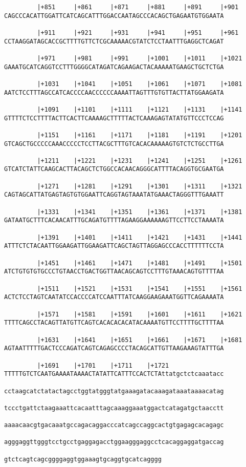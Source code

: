 \documentclass{article}
\begin{document}
\begin{Verbatim}
         |+851     |+861     |+871     |+881     |+891     |+901
CAGCCCACATTGGATTCATCAGCATTTGGACCAATAGCCCACAGCTGAGAATGTGGAATA

         |+911     |+921     |+931     |+941     |+951     |+961
CCTAAGGATAGCACCGCTTTTGTTCTCGCAAAAACGTATCTCCTAATTTGAGGCTCAGAT

         |+971     |+981     |+991     |+1001    |+1011    |+1021
GAAATGCATCAGGTCCTTTGGGGCATAGATCAGAAGACTACAAAAATGAAGCTGCTCTGA

         |+1031    |+1041    |+1051    |+1061    |+1071    |+1081
AATCTCCTTTAGCCATCACCCCAACCCCCCAAAATTAGTTTGTGTTACTTATGGAAGATA

         |+1091    |+1101    |+1111    |+1121    |+1131    |+1141
GTTTTCTCCTTTTACTTCACTTCAAAAGCTTTTTACTCAAAGAGTATATGTTCCCTCCAG

         |+1151    |+1161    |+1171    |+1181    |+1191    |+1201
GTCAGCTGCCCCCAAACCCCCTCCTTACGCTTTGTCACACAAAAAGTGTCTCTGCCTTGA

         |+1211    |+1221    |+1231    |+1241    |+1251    |+1261
GTCATCTATTCAAGCACTTACAGCTCTGGCCACAACAGGGCATTTTACAGGTGCGAATGA

         |+1271    |+1281    |+1291    |+1301    |+1311    |+1321
CAGTAGCATTATGAGTAGTGTGGAATTCAGGTAGTAAATATGAAACTAGGGTTTGAAATT

         |+1331    |+1341    |+1351    |+1361    |+1371    |+1381
GATAATGCTTTCACAACATTTGCAGATGTTTTAGAAGGAAAAAAGTTCCTTCCTAAAATA

         |+1391    |+1401    |+1411    |+1421    |+1431    |+1441
ATTTCTCTACAATTGGAAGATTGGAAGATTCAGCTAGTTAGGAGCCCACCTTTTTTCCTA

         |+1451    |+1461    |+1471    |+1481    |+1491    |+1501
ATCTGTGTGTGCCCTGTAACCTGACTGGTTAACAGCAGTCCTTTGTAAACAGTGTTTTAA

         |+1511    |+1521    |+1531    |+1541    |+1551    |+1561
ACTCTCCTAGTCAATATCCACCCCATCCAATTTATCAAGGAAGAAATGGTTCAGAAAATA

         |+1571    |+1581    |+1591    |+1601    |+1611    |+1621
TTTTCAGCCTACAGTTATGTTCAGTCACACACACATACAAAATGTTCCTTTTGCTTTTAA

         |+1631    |+1641    |+1651    |+1661    |+1671    |+1681
AGTAATTTTTGACTCCCAGATCAGTCAGAGCCCCTACAGCATTGTTAAGAAAGTATTTGA

         |+1691    |+1701    |+1711    |+1721               
TTTTTGTCTCAATGAAAATAAAACTATATTCATTTCCACTCTAttatgctctcaaatacc

cctaagcatctatactagcctggtatgggtatgaaagatacaaagataaataaaacatag

tccctgattctaagaaattcacaatttagcaaaggaaatggactcatagatgctaacctt

aaaacaacgtgacaaatgccagacaggacccatcagccaggcactgtgagagcacagagc

agggaggttgggtcctgcctgaggagacctggaagggaggcctcacaggaggatgaccag

gtctcagtcagcggggaggtggaaagtgcaggtgcatcagggg
                                           

\end{Verbatim}
\end{document}
